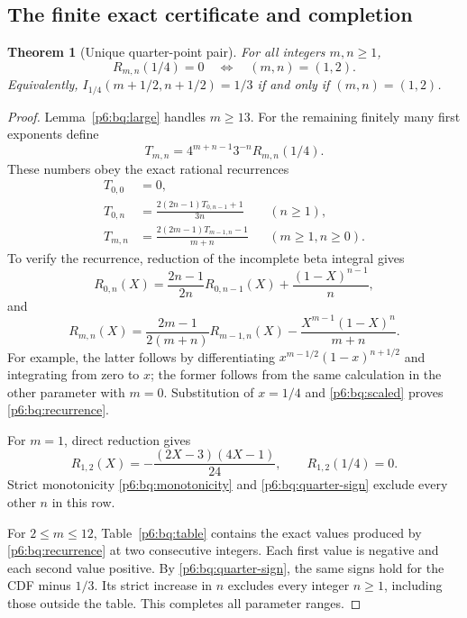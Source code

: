 \documentclass[11pt,a4paper]{article}
\newtheorem{theorem}{Theorem}[section]
\theoremstyle{definition}
\theoremstyle{remark}
\numberwithin{equation}{section}
\begin{document}
\subsection{The finite exact certificate and completion}

\begin{theorem}[Unique quarter-point pair]\label{p6:bq:quarter}
For all integers $m,n\ge1$,
\begin{equation}\label{p6:bq:quarter-iff}
 R_{m,n}(1/4)=0\quad\Longleftrightarrow\quad(m,n)=(1,2).
\end{equation}
Equivalently,
$I_{1/4}(m+1/2,n+1/2)=1/3$ if and only if $(m,n)=(1,2)$.
\end{theorem}

\begin{proof}
Lemma~\ref{p6:bq:large} handles $m\ge13$.
For the remaining finitely many first exponents define
\begin{equation}\label{p6:bq:scaled}
 T_{m,n}=4^{m+n-1}3^{-n}R_{m,n}(1/4).
\end{equation}
These numbers obey the exact rational recurrences
\begin{align}
 T_{0,0}&=0,\nonumber\\
 T_{0,n}&=\frac{2(2n-1)T_{0,n-1}+1}{3n}
                                  &&(n\ge1),\label{p6:bq:recurrence}\\
 T_{m,n}&=\frac{2(2m-1)T_{m-1,n}-1}{m+n}
                                  &&(m\ge1,n\ge0).\nonumber
\end{align}
To verify the recurrence, reduction of the incomplete beta
integral gives
\[
 R_{0,n}(X)=\frac{2n-1}{2n}R_{0,n-1}(X)
                 +\frac{(1-X)^{n-1}}n,
\]
and
\[
 R_{m,n}(X)=\frac{2m-1}{2(m+n)}R_{m-1,n}(X)
              -\frac{X^{m-1}(1-X)^n}{m+n}.
\]
For example, the latter follows by differentiating
$x^{m-1/2}(1-x)^{n+1/2}$ and integrating from zero to $x$;
the former follows from the same calculation in the other
parameter with $m=0$. Substitution of $x=1/4$ and
\eqref{p6:bq:scaled} proves \eqref{p6:bq:recurrence}.

For $m=1$, direct reduction gives
\[
 R_{1,2}(X)=-\frac{(2X-3)(4X-1)}{24},
 \qquad R_{1,2}(1/4)=0.
\]
Strict monotonicity \eqref{p6:bq:monotonicity} and
\eqref{p6:bq:quarter-sign} exclude every other $n$ in this row.

For $2\le m\le12$, Table~\ref{p6:bq:table} contains the exact
values produced by \eqref{p6:bq:recurrence} at two consecutive
integers. Each first value is negative and each second value
positive. By \eqref{p6:bq:quarter-sign}, the same signs hold for
the CDF minus $1/3$. Its strict increase in $n$ excludes
every integer $n\ge1$, including those outside the table.
This completes all parameter ranges.
\end{proof}
\end{document}
